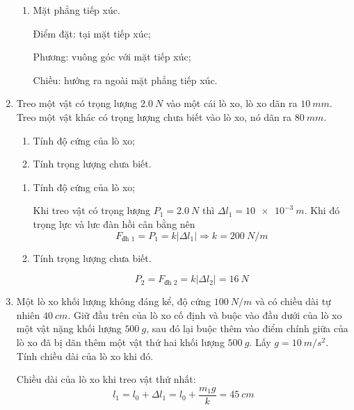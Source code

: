 \begin{enumerate}[label=\bfseries Câu \arabic*:]
{\begin{enumerate}
			Điểm đặt: 2 đầu;
			
			Phương: cùng phương với lực gây biến dạng;
			
			Chiều: hướng từ hai đầu dây vào phần giữa của sợi dây.
			
			\item Mặt phẳng tiếp xúc.
			
			Điểm đặt: tại mặt tiếp xúc;
			
			Phương: vuông góc với mặt tiếp xúc;
			
			Chiều: hướng ra ngoài mặt phẳng tiếp xúc.
		\end{enumerate}
	}
	\item {}
	
	
	{
		Treo một vật có trọng lượng $\SI{2.0}{N}$ vào một cái lò xo, lò xo dãn ra $\SI{10}{mm}$. Treo một vật khác có trọng lượng chưa biết vào lò xo, nó dãn ra $\SI{80}{mm}$.
		\begin{enumerate}
			\item Tính độ cứng của lò xo;
			\item Tính trọng lượng chưa biết.
		\end{enumerate}
	}
	
	\hideall
	{	
		\begin{enumerate}
			\item Tính độ cứng của lò xo;
			
			Khi treo vật có trọng lượng $P_1=\SI{2.0}{N}$ thì $\Delta l_1 = \SI{10e-3}{m}$. Khi đó trọng lực và lưc đàn hồi cân bằng nên
			$$F_\text{đh 1} = P_1 = k |\Delta l_1| \Rightarrow k = \SI{200}{N/m}$$
			
			\item Tính trọng lượng chưa biết.
			
			$$P_2 = F_\text{đh 2} =k |\Delta l_2| = \SI{16}{N} $$
		\end{enumerate}
	}
	
	\item {}
	
	
	{
		Một lò xo khối lượng không đáng kể, độ cứng $\SI{100}{N/m}$ và có chiều dài tự nhiên $\SI{40}{cm}$. Giữ đầu trên của lò xo cố định và buộc vào đầu dưới của lò xo một vật nặng khối lượng $\SI{500}{g}$, sau đó lại buộc thêm vào điểm chính giữa của lò xo đã bị dãn thêm một vật thứ hai khối lượng $\SI{500}{g}$. Lấy $g=\SI{10}{m/s^2}$. Tính chiều dài của lò xo khi đó.
	}
	
	\hideall
	{	
		Chiều dài của lò xo khi treo vật thứ nhất:
		$$l_1 = l_0 + \Delta l_1 = l_0 + \dfrac{m_1g}{k} = \SI{45}{cm}$$
		
}
\end{enumerate}
